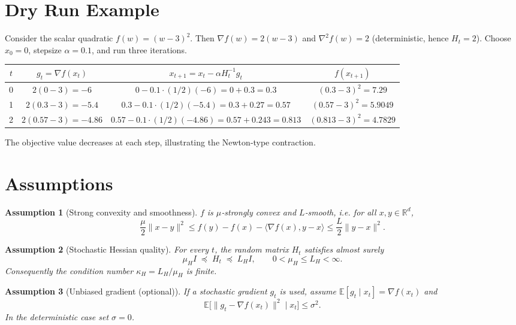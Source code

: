 \documentclass{article}
\newtheorem{assumption}{Assumption}
\newcommand{\E}{\mathbb{E}}
\newcommand{\R}{\mathbb{R}}
\begin{document}
\section*{Dry Run Example}
Consider the scalar quadratic $f(w)=(w-3)^2$.  
Then $\nabla f(w)=2(w-3)$ and $\nabla^2 f(w)=2$ (deterministic, hence $H_t=2$).  
Choose $x_0=0$, stepsize $\alpha=0.1$, and run three iterations.

\begin{center}
\begin{tabular}{c|c|c|c}
$t$ & $g_t= \nabla f(x_t)$ & $x_{t+1}=x_t-\alpha H_t^{-1}g_t$ & $f(x_{t+1})$\\ \hline
0 & $2(0-3)=-6$ & $0-0.1\cdot (1/2)(-6)=0+0.3=0.3$ & $(0.3-3)^2=7.29$\\
1 & $2(0.3-3)=-5.4$ & $0.3-0.1\cdot (1/2)(-5.4)=0.3+0.27=0.57$ & $(0.57-3)^2=5.9049$\\
2 & $2(0.57-3)=-4.86$ & $0.57-0.1\cdot (1/2)(-4.86)=0.57+0.243=0.813$ & $(0.813-3)^2=4.7829$
\end{tabular}
\end{center}

The objective value decreases at each step, illustrating the Newton‑type contraction.

\newpage
\section*{Assumptions}
\begin{assumption}[Strong convexity and smoothness]\label{ass:strong}
$f$ is $\mu$‑strongly convex and $L$‑smooth, i.e. for all $x,y\in\R^{d}$,
\[
\frac{\mu}{2}\|x-y\|^{2}\le f(y)-f(x)-\langle\nabla f(x),y-x\rangle\le 
\frac{L}{2}\|y-x\|^{2}.
\]
\end{assumption}

\begin{assumption}[Stochastic Hessian quality]\label{ass:hessian}
For every $t$, the random matrix $H_t$ satisfies almost surely
\[
\mu_H I \;\preceq\; H_t\; \preceq\; L_H I ,\qquad 
0<\mu_H\le L_H<\infty .
\]
Consequently the condition number $\kappa_H=L_H/\mu_H$ is finite.
\end{assumption}

\begin{assumption}[Unbiased gradient (optional)]\label{ass:grad}
If a stochastic gradient $g_t$ is used, assume $\E[g_t\mid x_t]=\nabla f(x_t)$ and
\[
\E\big[\|g_t-\nabla f(x_t)\|^{2}\mid x_t\big]\le\sigma^{2}.
\]
In the deterministic case set $\sigma=0$.
\end{assumption}
\end{document}
